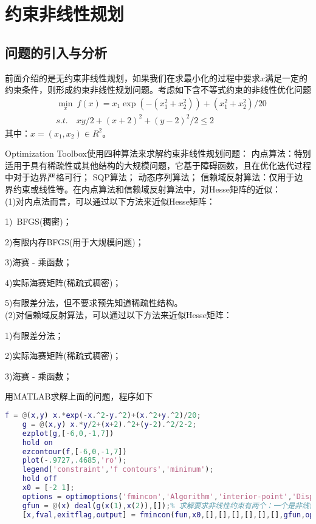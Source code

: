 
\chapter{约束非线性规划}
\section{问题的引入与分析}
    \par
    前面介绍的是无约束非线性规划，如果我们在求最小化的过程中要求$x$满足一定的约束条件，则形成约束非线性规划问题。考虑如下含不等式约束的非线性优化问题
    \begin{align*}
    & \mathop {\min}\limits_x\  f(x)=x_1\exp(-(x_1^2+x_2^2))+(x_1^2+x_2^2)/20\\
    & s.t. \quad xy/2+(x+2)^2+(y-2)^2/2 \leqslant 2
    \end{align*}
    其中：$x=(x_1,x_2) \in R^2$。
    \par
    Optimization Toolbox使用四种算法来求解约束非线性规划问题：
    内点算法：特别适用于具有稀疏性或其他结构的大规模问题，它基于障碍函数，且在优化迭代过程中对于边界严格可行；
    SQP算法；
    动态序列算法；
    信赖域反射算法：仅用于边界约束或线性等。在内点算法和信赖域反射算法中，对Hesse矩阵的近似：\\
    (1)对内点法而言，可以通过以下方法来近似Hesse矩阵：\par
    1)\ BFGS(稠密)；\par
    2)有限内存BFGS(用于大规模问题)；\par
    3)海赛 - 乘函数；\par
    4)实际海赛矩阵(稀疏式稠密)；\par
    5)有限差分法，但不要求预先知道稀疏性结构。\\
    (2)对信赖域反射算法，可以通过以下方法来近似Hesse矩阵：\par
    1)有限差分法；\par
    2)实际海赛矩阵(稀疏式稠密)；\par
    3)海赛 - 乘函数；\par
    用MATLAB求解上面的问题，程序如下
    \begin{lstlisting}[language=Matlab]
    f = @(x,y) x.*exp(-x.^2-y.^2)+(x.^2+y.^2)/20;
    g = @(x,y) x.*y/2+(x+2).^2+(y-2).^2/2-2;
    ezplot(g,[-6,0,-1,7])
    hold on
    ezcontour(f,[-6,0,-1,7])
    plot(-.9727,.4685,'ro');
    legend('constraint','f contours','minimum');
    hold off
    x0 = [-2 1];
    options = optimoptions('fmincon','Algorithm','interior-point','Display','iter');% 求解器fmincon使用内点算法（interior-point aligorithm），并打开每一次迭代的结果。
    gfun = @(x) deal(g(x(1),x(2)),[]);% 求解要求非线性约束有两个：一个是非线性不等式，另一个是非线性等式。我们用deal函数写这个约束。
    [x,fval,exitflag,output] = fmincon(fun,x0,[],[],[],[],[],[],gfun,options);
    \end{lstlisting}

